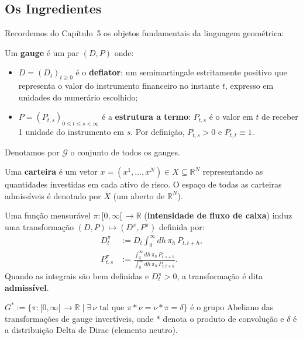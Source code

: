 \subsection{Os Ingredientes}

Recordemos do Cap\'itulo~5 os objetos fundamentais da linguagem geom\'etrica:

\begin{defi}[Gauge]\label{def:gauge_recap}
Um \textbf{gauge} \'e um par $(D, P)$ onde:
\begin{itemize}
 \item $D = (D_t)_{t \geq 0}$ \'e o \textbf{deflator}: um semimartingale
 estritamente positivo que representa o valor do instrumento financeiro
 no instante $t$, expresso em unidades do numer\'ario escolhido;
 \item $P = (P_{t,s})_{0 \leq t \leq s < \infty}$ \'e a
 \textbf{estrutura a termo}: $P_{t,s}$ \'e o valor em $t$ de receber
 1 unidade do instrumento em $s$. Por defini\c{c}\~ao,
 $P_{t,s} > 0$ e $P_{t,t} \equiv 1$.
\end{itemize}
Denotamos por $\mathcal{G}$ o conjunto de todos os gauges.
\end{defi}

\begin{defi}[Carteira]
Uma \textbf{carteira} \'e um vetor $x = (x^1, \dots, x^N) \in X \subseteq
\mathbb{R}^N$ representando as quantidades investidas em cada ativo de risco.
O espa\c{c}o de todas as carteiras admiss\'iveis \'e denotado por $X$
(um aberto de $\mathbb{R}^N$).
\end{defi}

\begin{defi}\label{def:tg}
Uma fun\c{c}\~ao mensur\'avel $\pi: [0, \infty[\, \to \mathbb{R}$
(\textbf{intensidade de fluxo de caixa}) induz uma transforma\c{c}\~ao
$(D, P) \mapsto (D^\pi, P^\pi)$ definida por:
\begin{align}
 D_t^\pi &:= D_t \int_0^\infty dh \, \pi_h \, P_{t, t+h},
 \label{eq:D_pi} \\
 P_{t,s}^\pi &:= \frac{\int_0^\infty dh \, \pi_h \, P_{t, s+h}}
 {\int_0^\infty dh \, \pi_h \, P_{t, t+h}}.
 \label{eq:P_pi}
\end{align}
Quando as integrais s\~ao bem definidas e $D_t^\pi > 0$, a transforma\c{c}\~ao
\'e dita \textbf{admiss\'ivel}.
\end{defi}

\begin{defi}[Grupo $G^*$]\label{def:Gstar}
$G^* := \{\pi: [0,\infty[\, \to \mathbb{R} \mid \exists\, \nu \text{ tal que }
\pi * \nu = \nu * \pi = \delta\}$ \'e o grupo Abeliano das transforma\c{c}\~oes
de gauge invert\'iveis, onde $*$ denota o produto de convolu\c{c}\~ao e
$\delta$ \'e a distribui\c{c}\~ao Delta de Dirac (elemento neutro).
\end{defi}

